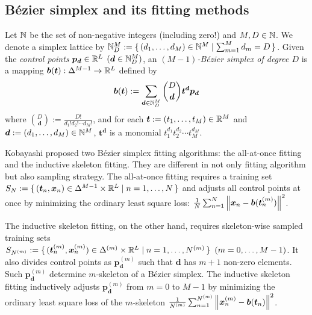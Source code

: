 \documentclass{article}
\begin{document}
\subsection{B\'ezier simplex and its fitting methods}\label{sec:bezier-simplex}
Let $\mathbb{N}$ be the set of non-negative integers (including zero!) and $M, D \in \mathbb{N}$.
We denote a simplex lattice by $\mathbb{N}_D^M := \set{(d_1,\dots,d_M) \in \mathbb{N}^M | \sum_{m=1}^M d_m = D}$.
Given the \emph{control points} $\bm p_{\bm d} \in \mathbb{R}^L$ $(\bm d \in \mathbb{N}_D^M)$, an \emph{$(M - 1)$-B\'ezier simplex of degree $D$} is a mapping $\bm b(\bm t): \Delta^{M-1}\to\mathbb{R}^L$ defined by
\begin{equation}\label{eqn:bezier-simplex}
\bm b(\bm t) := \sum_{\bm d\in\mathbb{N}_D^M} \binom{D}{\bm d} \bm t^{\bm d} \bm p_{\bm d}
\end{equation}
where $\binom{D}{\bm d} := \frac{D!}{d_1! d_2! \cdots d_M!}$, and for each $\bm t := (t_1, \dots, t_M) \in \mathbb{R}^M$ and $\bm d := (d_1, \dots, d_M) \in \mathbb{N}^M$, $\bm t^{\bm d}$ is a monomial $t^{d_1}_1 t^{d_2}_2 \cdots t^{d_M}_M$.

Kobayashi  \cite{Kobayashi2019} proposed two B\'ezier simplex fitting algorithms: the all-at-once fitting and the inductive skeleton fitting.
They are different in not only fitting algorithm but also sampling strategy.
The all-at-once fitting requires a training set $S_N:=\set{(\bm t_n, \bm x_n) \in \Delta^{M-1} \times \mathbb{R}^L | n = 1, \dots, N}$ and adjusts all control points at once by minimizing the ordinary least square loss: $\frac{1}{N}\sum_{n=1}^N \left\| \bm x_n - \bm b(\bm t_n^{(m)}) \right\|^2$.

The inductive skeleton fitting, on the other hand, requires skeleton-wise sampled training sets $S_{N^{(m)}} := \set{(\bm t^{(m)}_n, \bm x^{(m)}_n) \in \Delta^{(m)} \times \mathbb{R}^L | n = 1, \dots, N^{(m)}}~(m=0,\ldots,M-1)$.
It also divides control points as $\bm p_{\bm d}^{(m)}$ such that $\bm d$ has $m+1$ non-zero elements.
Such $\bm p_{\bm d}^{(m)}$ determine $m$-skeleton of a B\'ezier simplex.
The inductive skeleton fitting inductively adjusts $\bm p_{\bm d}^{(m)}$ from $m = 0$ to $M - 1$ by minimizing the ordinary least square loss of the $m$-skeleton $\frac{1}{N^{(m)}}\sum_{n=1}^{N^{(m)}} \left\| \bm x^{(m)}_n - \bm b(\bm t_n) \right\|^2$.
\end{document}
